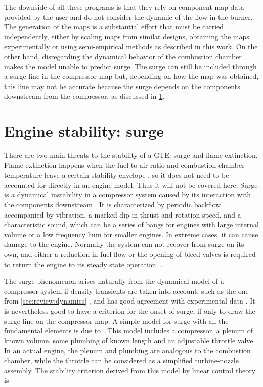 The downside of all these programs is that they rely on component map data provided by the user 
and do not consider the dynamic of the flow in the burner.
The generation of the maps is a substantial effort that must be carried independently, 
either by scaling maps from similar designs, obtaining the maps experimentally 
or using semi-empirical methods as described in this work. 
On the other hand, disregarding the dynamical behavior of the combustion chamber makes the model unable to predict surge. The surge can still be included through a surge line in the compressor map but,
depending on how the map was obtained, this line may not be accurate because the surge depends on the components downstream from the compressor, as discussed in \cref{sec:review:surge}.

\section{Engine stability: surge}
\label{sec:review:surge}

There are two main threats to the stability of a \ac{GTE}: surge and flame extinction.
Flame extinction happens when the fuel to air ratio and combustion chamber temperature 
leave a certain stability envelope \cite{Mattingly1996}, 
so it does not need to be accounted for directly in an engine model.
Thus it will not be covered here.
Surge is a dynamical instability in a compressor system caused by its interaction with the components downstream \cite{Sparks1983}. 
It is characterized by periodic backflow accompanied by vibration, a marked dip in thrust and rotation speed, and a characteristic sound, 
which can be a series of bangs for engines with large internal volume or a low frequency hum for smaller engines.
In extreme cases, it can cause damage to the engine. 
Normally the system can not recover from surge on its own, 
and either a reduction in fuel flow or the opening of bleed valves is required to return the engine to its steady state operation.
\cite{Willems1999}.

The surge phenomenon arises naturally from the dynamical model of a compressor system if density transients are taken into account, such as the one from \cref{sec:review:dynamics} \cite{Greitzer1976}, 
and has good agreement with experimental data \cite{Greitzer1976_2,Gravdahl2004}.
It is nevertheless good to have a criterion for the onset of surge, if only to draw the surge line on the compressor map.
A simple model for surge with all the fundamental elements is due to \textcite{Fink1988}. This model includes a compressor, a plenum of known volume, some plumbing of known length and an adjustable throttle valve. 
In an actual engine, the plenum and plumbing are analogous to the combustion chamber, while the throttle can be considered as a simplified turbine-nozzle assembly. 
The stability criterion derived from this model by linear control theory is

